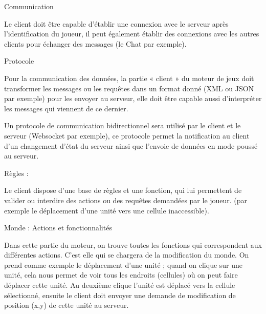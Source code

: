 \documentclass[a4paper,10pt]{report}
\begin{document}
Communication

Le client doit être capable d’établir une connexion avec le serveur après l’identification du joueur, il peut également établir des connexions avec les autres clients pour échanger des messages (le Chat par exemple).

Protocole

Pour la communication des données, la partie « client » du moteur de jeux doit transformer les messages ou les requêtes dans un format donné (XML ou JSON par exemple) pour les envoyer au serveur, elle doit être capable aussi d’interpréter les messages qui viennent de ce dernier.

Un protocole de communication bidirectionnel sera utilisé par le client et le serveur (Websocket par exemple), ce protocole permet la notification au client d’un changement d’état du serveur ainsi que l’envoie de données en mode poussé au serveur.

Règles :

Le client dispose d’une base de règles et une fonction, qui lui permettent de valider ou interdire des actions ou des requêtes demandées par le joueur. (par exemple le déplacement d’une unité vers une cellule inaccessible).

Monde : Actions et fonctionnalités

Dans cette partie du moteur, on trouve toutes les fonctions qui correspondent aux différentes actions. C'est elle qui se chargera de la modification du monde. On prend comme exemple le déplacement d’une unité ; quand on clique sur une unité, cela nous permet de voir tous les endroits (cellules) où on peut faire déplacer cette unité. Au deuxième clique l’unité est déplacé vers la cellule sélectionné, ensuite le client doit envoyer une demande de modification de position (x,y) de cette unité au serveur.
\end{document}
